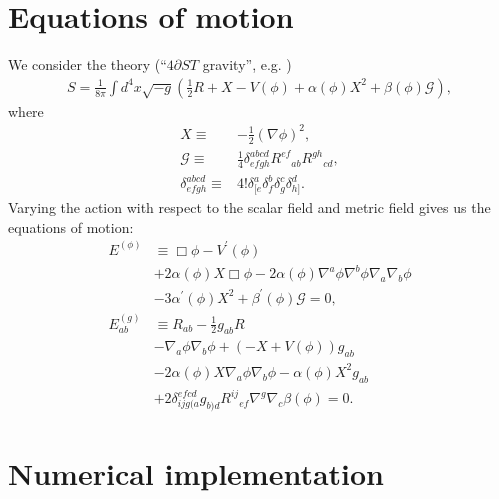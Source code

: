 \documentclass[a4paper,11pt]{article}
\begin{document}
\section{Equations of motion}
   We consider the theory (``$4\partial ST$ gravity'', e.g. \cite{Kovacs:2020ywu})
\begin{align}
   S
   =
   \frac{1}{8\pi}\int d^4x\sqrt{-g}\left(
      \frac{1}{2}R
   +  X
   -  V(\phi)
   +  \alpha(\phi)X^2
   +  \beta(\phi)\mathcal{G}
   \right)
   ,
\end{align}
   where
\begin{subequations}
\begin{align}
   X
   \equiv&
-  \frac{1}{2}\left(\nabla\phi\right)^2
   ,\\
   \mathcal{G}
   \equiv&
   \frac{1}{4}\delta^{abcd}_{efgh}
   R^{ef}{}_{ab}R^{gh}{}_{cd}
   ,\\
   \delta^{abcd}_{efgh}
   \equiv&
   4!\delta^a_{[e}\delta^b_f\delta^c_g\delta^d_{h]}
   .
\end{align}
\end{subequations}
   Varying the action with respect to the scalar field and metric field
gives us the equations of motion:
\begin{align}
\label{eq:eom_edgb_scalar}
   E^{(\phi)}
   &\equiv
      \Box\phi
   -  V^{\prime}\left(\phi\right)
   \nonumber\\&
   +  2\alpha\left(\phi\right)X \Box\phi
   -  2\alpha\left(\phi\right)\nabla^a\phi\nabla^b\phi\nabla_a\nabla_b\phi
   \nonumber\\&
   -  3\alpha^{\prime}\left(\phi\right)X^2
   +  \beta^{\prime}\left(\phi\right)\mathcal{G}
   =
   0
   ,\\
\label{eq:eom_edgb_tensor}
   E^{(g)}_{ab}
   &\equiv
   R_{ab}
-  \frac{1}{2}g_{ab}R
   \nonumber\\&
-  \nabla_a\phi\nabla_b\phi
+  \left(-X+V\left(\phi\right)\right)g_{ab}
   \nonumber\\&
-  2\alpha\left(\phi\right)X\nabla_a\phi\nabla_b\phi
-  \alpha\left(\phi\right)X^2g_{ab}
   \nonumber\\&
+  2\delta^{efcd}_{ijg(a}g_{b)d}R^{ij}{}_{ef}
   \nabla^g\nabla_c\beta\left(\phi\right) 
   =
   0
   .
\end{align}
\section{Numerical implementation}
\end{document}
